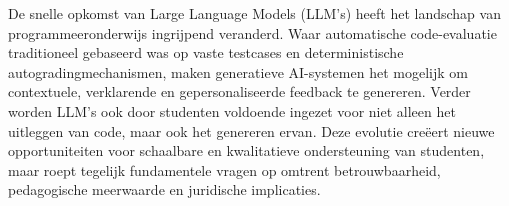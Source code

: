 





De snelle opkomst van Large Language Models (LLM’s) heeft het landschap van programmeeronderwijs ingrijpend veranderd. Waar automatische code-evaluatie traditioneel gebaseerd was op vaste testcases en deterministische autogradingmechanismen, maken generatieve AI-systemen het mogelijk om contextuele, verklarende en gepersonaliseerde feedback te genereren. Verder worden LLM's ook door studenten voldoende ingezet voor niet alleen het uitleggen van code, maar ook het genereren ervan. Deze evolutie creëert nieuwe opportuniteiten voor schaalbare en kwalitatieve ondersteuning van studenten, maar roept tegelijk fundamentele vragen op omtrent betrouwbaarheid, pedagogische meerwaarde en juridische implicaties.

